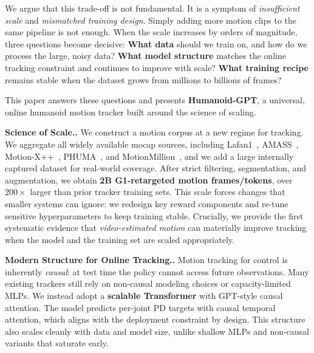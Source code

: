 \documentclass{llmxive}
\providecommand{\paragraph}[1]{\vspace{.5em}\noindent\textbf{#1.}}
\begin{document}
We argue that this trade-off is not fundamental. It is a symptom of \emph{insufficient scale} and \emph{mismatched training design}. Simply adding more motion clips to the same pipeline is not enough. When the scale increases by orders of magnitude, three questions become decisive:
 \textbf{What data} should we train on, and how do we process the large, noisy data?
 \textbf{What model structure} matches the online tracking constraint and continues to improve with scale?
 \textbf{What training recipe} remains stable when the dataset grows from millions to billions of frames?

This paper answers these questions and presents \textbf{Humanoid-GPT}, a universal, online humanoid motion tracker built around the science of scaling.


\paragraph{Science of Scale.}
We construct a motion corpus at a new regime for tracking. We aggregate all widely available mocap sources, including Lafan1~\cite{lafan20}, AMASS~\cite{amass19}, Motion-X++~\cite{motionx++25}, PHUMA~\cite{phuma25}, and MotionMillion~\cite{motionmillion25}, and we add a large internally captured dataset for real-world coverage. After strict filtering, segmentation, and augmentation, we obtain \textbf{2B G1-retargeted motion frames/tokens}, over \textbf{$200\times$} larger than prior tracker training sets. This scale forces changes that smaller systems can ignore: we redesign key reward components and re-tune sensitive hyperparameters to keep training stable. Crucially, we provide the first systematic evidence that \emph{video-estimated motion} can materially improve tracking when the model and the training set are scaled appropriately.

\paragraph{Modern Structure for Online Tracking.}
Motion tracking for control is inherently \emph{causal}: at test time the policy cannot access future observations. Many existing trackers still rely on non-causal modeling choices or capacity-limited MLPs. We instead adopt a \textbf{scalable Transformer} with GPT-style causal attention. The model predicts per-joint PD targets with causal temporal attention, which aligns with the deployment constraint by design. This structure also scales cleanly with data and model size, unlike shallow MLPs and non-causal variants that saturate early.
\end{document}

